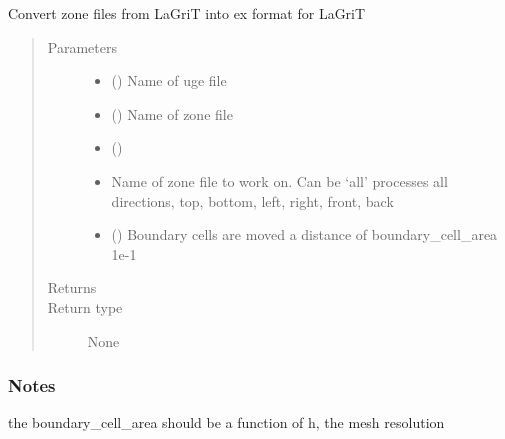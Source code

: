 \documentclass[letterpaper,10pt,english]{sphinxmanual}
\begin{document}
\begin{fulllineitems}
\label{\detokenize{pydfnworks:pydfnworks.dfnFlow.pflotran.zone2ex}}
Convert zone files from LaGriT into ex format for LaGriT
\begin{quote}\begin{description}
\item[{Parameters}] \leavevmode\begin{itemize}
\item {} 
 () \textendash{} Name of uge file

\item {} 
 () \textendash{} Name of zone file

\item {} 
 () \textendash{} 

\item {} 
 \textendash{} Name of zone file to work on. Can be ‘all’ processes all directions, top, bottom, left, right, front, back

\item {} 
 () \textendash{} Boundary cells are moved a distance of boundary\_cell\_area 1e-1

\end{itemize}

\item[{Returns}] \leavevmode


\item[{Return type}] \leavevmode
None

\end{description}\end{quote}
\subsubsection*{Notes}

the boundary\_cell\_area should be a function of h, the mesh resolution

\end{fulllineitems}
\end{document}
